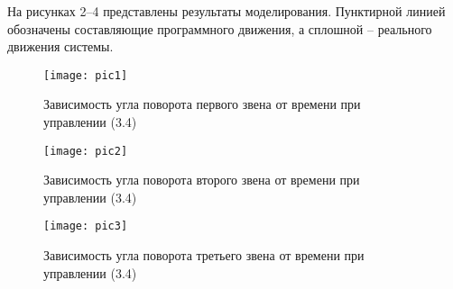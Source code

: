  На рисунках 2–4 представлены результаты моделирования. Пунктирной линией обозначены  составляющие программного движения, а сплошной – реального движения системы.
 
 
  \begin{figure}[h]
  	\centering
  	\texttt{[image: pic1]}
  	\caption{Зависимость угла поворота первого звена от времени при управлении (3.4) }
  	\label{fig:manip2}
  \end{figure}
  
  \begin{figure}[h]
    	\centering
    	\texttt{[image: pic2]}
    	\caption{Зависимость угла поворота второго звена от времени при управлении (3.4)  }
    	\label{fig:manip2}
    \end{figure}
    
      \begin{figure}[h]
      	\centering
      	\texttt{[image: pic3]}
      	\caption{Зависимость угла поворота третьего звена от времени при управлении (3.4) }
      	\label{fig:manip2}
      \end{figure}